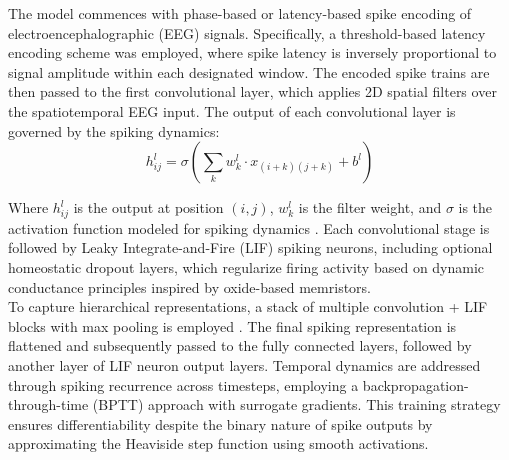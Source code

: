 
\noindent The model commences with phase-based or latency-based spike encoding of electroencephalographic (EEG) signals. Specifically, a threshold-based latency encoding scheme was employed, where spike latency is inversely proportional to signal amplitude within each designated window. The encoded spike trains are then passed to the first convolutional layer, which applies 2D spatial filters over the spatiotemporal EEG input. The output of each convolutional layer is governed by the spiking dynamics:
\begin{equation} h_{ij}^{l} = \sigma \left( \sum _{k} w_{k}^{l} \cdot x_{(i+k)(j+k)} + b^{l} \right) \label{eq:7.6}
\end{equation}

\noindent Where $h_{ij}^{l}$ is the output at position $(i,j)$, $ w_{k}^{l}$ is the filter weight, and $\sigma$ is the activation function modeled for spiking dynamics \cite{tavanaei2019deep}. Each convolutional stage is followed by Leaky Integrate-and-Fire (LIF) spiking neurons, including optional homeostatic dropout layers, which regularize firing activity based on dynamic conductance principles inspired by oxide-based memristors.\\


\noindent To capture hierarchical representations, a stack of multiple convolution + LIF blocks with max pooling is employed \cite{shrestha2018slayer}. The final spiking representation is flattened and subsequently passed to the fully connected layers, followed by another layer of LIF neuron output layers. Temporal dynamics are addressed through spiking recurrence across timesteps, employing a backpropagation-through-time (BPTT) approach with surrogate gradients. This training strategy ensures differentiability despite the binary nature of spike outputs by approximating the Heaviside step function using smooth activations.

